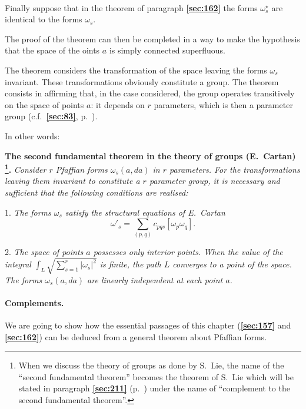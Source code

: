 \documentclass[leqno,11pt]{book}
\numberwithin{equation}{chapter}
\theoremstyle{shape1}
\theoremstyle{shapesmall}
\newcommand{\fsref}[1]{{\rm\textsection\textbf{\ref{sec:#1}}}}
\newcommand{\str}{^{\star}}
\newcommand{\somespace}{\vspace{9pt}}
\begin{document}
\paragraph{}
\label{sec:165}
Finally suppose that in the theorem of paragraph \fsref{162} the forms $\omega_{s}\str$ are identical to the forms $\omega_{s}$.

The proof of the theorem can then be completed in a way to make the hypothesis that the space of the oints $a$ is simply connected superfluous.

The theorem considers the transformation of the space leaving the forms $\omega_{s}$ invariant. These transformations obviously constitute a group. The theorem consists in affirming that, in the case considered, the group operates transitively on the space of points $a$: it depends on $r$ parameters, which is then a parameter group (c.f.~\fsref{83}, p.~\pageref{sec:83}).

In other words:

\somespace

\textbf{The second fundamental theorem in the theory of groups (E.~Cartan) \footnote{When we discuss the theory of groups as done by S.~Lie, the name of the ``second fundamental theorem'' becomes the theorem of S.~Lie which will be stated in paragraph \fsref{211} (p.~\pageref{sec:211}) under the name of ``complement to the second fundamental theorem''.}.} \emph{Consider $r$ Pfaffian forms $\omega_{s}(a,da)$ in $r$ parameters. For the transformations leaving them invariant to constitute a $r$ parameter group, it is necessary and sufficient that the following conditions are realised:}

\somespace

1. \emph{The forms $\omega_{s}$ satisfy the structural equations of E.~Cartan}
\[
\omega'_{s}=\sum_{(p,q)}c_{pqs}[\omega_{p}\omega_{q}].
\]

2. \emph{The space of points $a$ possesses only interior points. When the value of the integral $\displaystyle{\int_{L}\sqrt{\sum_{s=1}^{r}|\omega_{s}|^{2}}}$ is finite, the path $L$ converges to a point of the space. The forms $\omega_{s}(a,da)$ are linearly independent at each point $a$.}

\paragraph{Complements.}
\label{sec:166}
We are going to show how the essential passages of this chapter (\fsref{157} and \fsref{162}) can be deduced from a general theorem about Pfaffian forms.
\end{document}
